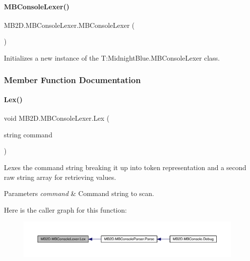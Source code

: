 \paragraph{\texorpdfstring{M\+B\+Console\+Lexer()}{MBConsoleLexer()}}
{\footnotesize\ttfamily M\+B2\+D.\+M\+B\+Console\+Lexer.\+M\+B\+Console\+Lexer (\begin{DoxyParamCaption}{ }\end{DoxyParamCaption})\hspace{0.3cm}{\ttfamily [inline]}}



Initializes a new instance of the T\+:\+Midnight\+Blue.\+M\+B\+Console\+Lexer class. 



\subsubsection{Member Function Documentation}
\hypertarget{class_m_b2_d_1_1_m_b_console_lexer_a6c09fcdb1a36eff50201b9f5469bd55c}{}\label{class_m_b2_d_1_1_m_b_console_lexer_a6c09fcdb1a36eff50201b9f5469bd55c} 
\paragraph{\texorpdfstring{Lex()}{Lex()}}
{\footnotesize\ttfamily void M\+B2\+D.\+M\+B\+Console\+Lexer.\+Lex (\begin{DoxyParamCaption}\item[{string}]{command }\end{DoxyParamCaption})\hspace{0.3cm}{\ttfamily [inline]}}



Lexes the command string breaking it up into token representation and a second raw string array for retrieving values. 


\begin{DoxyParams}{Parameters}
{\em command} & Command string to scan.\\
\hline
\end{DoxyParams}
Here is the caller graph for this function\+:
\nopagebreak
\begin{figure}[H]
\begin{center}
\leavevmode
\includegraphics[width=350pt]{class_m_b2_d_1_1_m_b_console_lexer_a6c09fcdb1a36eff50201b9f5469bd55c_icgraph}
\end{center}
\end{figure}
\hypertarget{class_m_b2_d_1_1_m_b_console_lexer_ab083ced0d68a7f7278fbb462a9c60410}{}\label{class_m_b2_d_1_1_m_b_console_lexer_ab083ced0d68a7f7278fbb462a9c60410} 
